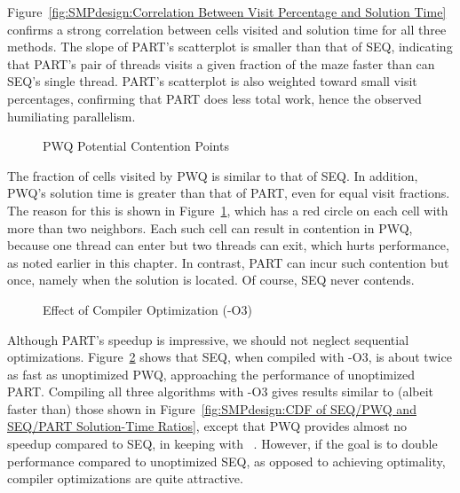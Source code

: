 Figure~\ref{fig:SMPdesign:Correlation Between Visit Percentage and Solution Time}
confirms a strong correlation between cells visited and solution time
for all three methods.
The slope of PART's scatterplot is smaller than that of SEQ,
indicating that PART's pair of threads visits a given fraction
of the maze faster than can SEQ's single thread.
PART's scatterplot is also weighted toward small visit
percentages, confirming that PART does less total work, hence
the observed humiliating parallelism.

\begin{figure}
\centering
{}
\caption{PWQ Potential Contention Points}
\label{fig:SMPdesign:PWQ Potential Contention Points}
\end{figure}

The fraction of cells visited by PWQ is similar to that of SEQ\@.
In addition, PWQ's solution time is greater than that of PART,
even for equal visit fractions.
The reason for this is shown in
Figure~\ref{fig:SMPdesign:PWQ Potential Contention Points}, which has a red
circle on each cell with more than two neighbors.
Each such cell can result in contention in PWQ, because
one thread can enter but two threads can exit, which hurts
performance, as noted earlier in this chapter.
In contrast, PART can incur such contention but once, namely
when the solution is located.
Of course, SEQ never contends.

\begin{figure}
\centering
{}
\caption{Effect of Compiler Optimization (-O3)}
\label{fig:SMPdesign:Effect of Compiler Optimization (-O3)}
\end{figure}

Although PART's speedup is impressive, we should not neglect sequential
optimizations.
Figure~\ref{fig:SMPdesign:Effect of Compiler Optimization (-O3)} shows that
SEQ, when compiled with -O3, is about twice as fast
as unoptimized PWQ, approaching the performance of unoptimized PART\@.
Compiling all three algorithms with -O3 gives results similar to
(albeit faster than) those shown in
Figure~\ref{fig:SMPdesign:CDF of SEQ/PWQ and SEQ/PART Solution-Time Ratios},
except that PWQ provides almost no speedup compared
to SEQ, in keeping with ~\cite{GeneAmdahl1967AmdahlsLaw}.
However, if the goal is to double performance compared to unoptimized
SEQ, as opposed to achieving optimality, compiler
optimizations are quite attractive.

